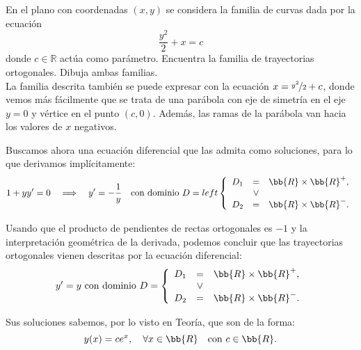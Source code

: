 \documentclass[12pt]{article}
\begin{document}
    \begin{ejercicio}
        En el plano con coordenadas $(x, y)$ se considera la familia de curvas dada por la ecuación
        \begin{equation*}
            \dfrac{y^2}{2} + x=c
        \end{equation*}
        donde $c \in \mathbb{R}$ actúa como parámetro. Encuentra la familia de trayectorias ortogonales. Dibuja ambas familias.\\

        La familia descrita también se puede expresar con la ecuación $x= \nicefrac{y^2}{2} + c$, donde vemos más fácilmente que se trata de una parábola con eje de simetría en el eje $y=0$ y vértice en el punto $(c, 0)$. Además, las ramas de la parábola van hacia los valores de $x$ negativos.

        Buscamos ahora una ecuación diferencial que las admita como soluciones, para lo que derivamos implícitamente:
        \begin{equation*}
            1+yy' = 0 \quad \Longrightarrow \quad y' = -\dfrac{1}{y} \quad \text{con dominio }D=left\left\{\begin{array}{rcl}
                D_1&=&\bb{R}\times \bb{R}^+,\\
                &\lor& \\
                D_2&=&\bb{R}\times \bb{R}^-.
            \end{array} \right.
        \end{equation*}

        Usando que el producto de pendientes de rectas ortogonales es $-1$ y la interpretación geométrica de la derivada, podemos concluir que las trayectorias ortogonales vienen descritas por la ecuación diferencial:
        \begin{equation*}
            y' = y  \text{ con dominio } D=\left\{\begin{array}{rcl}
                D_1&=&\bb{R}\times \bb{R}^+,\\
                &\lor& \\
                D_2&=&\bb{R}\times \bb{R}^-.
            \end{array} \right.
        \end{equation*}

        Sus soluciones sabemos, por lo visto en Teoría, que son de la forma:
        \begin{equation*}
            y(x) = c e^x,\quad \forall x\in \bb{R}\quad \text{con } c \in \bb{R}.
        \end{equation*}


\end{ejercicio}
\end{document}
